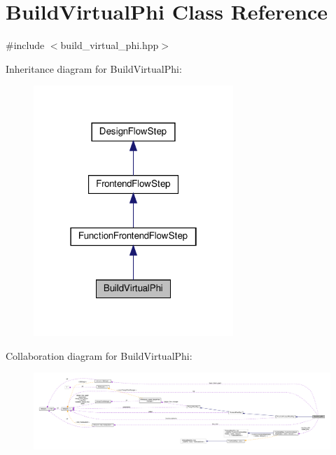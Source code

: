 \hypertarget{classBuildVirtualPhi}{}\section{Build\+Virtual\+Phi Class Reference}
\label{classBuildVirtualPhi}


{\ttfamily \#include $<$build\+\_\+virtual\+\_\+phi.\+hpp$>$}



Inheritance diagram for Build\+Virtual\+Phi\+:
\nopagebreak
\begin{figure}[H]
\begin{center}
\leavevmode
\includegraphics[width=214pt]{d0/da1/classBuildVirtualPhi__inherit__graph}
\end{center}
\end{figure}


Collaboration diagram for Build\+Virtual\+Phi\+:
\nopagebreak
\begin{figure}[H]
\begin{center}
\leavevmode
\includegraphics[width=350pt]{dc/dc1/classBuildVirtualPhi__coll__graph}
\end{center}
\end{figure}
